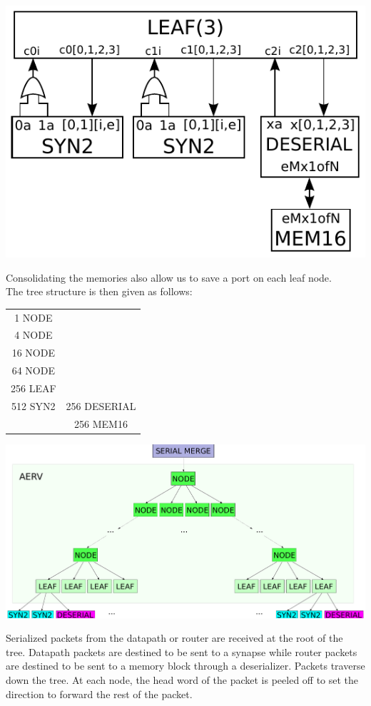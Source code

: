 \documentclass{article}
\begin{document}
\begin{center}
  \includegraphics[width=.4\textwidth]{img/recv_nrn_interface_2syn2_1mem16.pdf}
\end{center}

\noindent
Consolidating the memories also allow us to save a port on each leaf node. \\
The tree structure is then given as follows:

\begin{center}
    \begin{tabular}{cc}
        1 NODE & \\
        4 NODE & \\
        16 NODE & \\
        64 NODE & \\
        256 LEAF & \\
        512 SYN2 & 256 DESERIAL \\
        & 256 MEM16 \\
    \end{tabular}
\end{center}

\begin{center}
  \includegraphics[width=.7\textwidth]{img/aerv.pdf}
\end{center}
Serialized packets from the datapath or router are received at the root of the tree.
Datapath packets are destined to be sent to a synapse while router packets
are destined to be sent to a memory block through a deserializer. Packets
traverse down the tree. At each node, the head word of the packet is peeled
off to set the direction to forward the rest of the packet.

\end{document}
